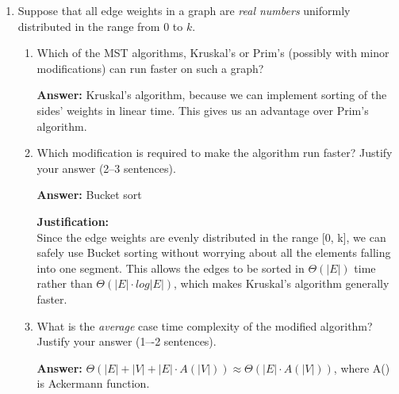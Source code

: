 \documentclass[dvipsnames]{article}
\begin{document}
\begin{enumerate}
\begin{enumerate}
    \item Justify the asymptotic time complexity (1--3 sentences).

    \color{blue}
    \textbf{Justification:}\\
    Adding a vertex takes $\Theta(1)$. Adding all sides will take $\Theta(|V|-1)$ in the worst case, if the new vertex is connected to each old one. The most expensive is the Kruskal's algorithm, which takes $\Theta(|V|\cdot \log(|V|))$, but since the maximum number of edges in the algorithm is the old $|V| -1$ and the new ones added in the worst case $|V| - 1$ give us $\Theta((2\cdot |V|-2)\cdot \log(|V|)) \approx \Theta(|V|\cdot \log(|V|))$. Therefore, $\Theta(1 + |V| - 1+|V|\cdot \log(|V|)) \approx \Theta(|V|\cdot \log(|V|))$
    \color{black}
  \end{enumerate}

  \clearpage
  \item Suppose that all edge weights in a graph are \emph{real numbers} uniformly distributed in the range from $0$ to $k$.

  \begin{enumerate}
    \item Which of the MST algorithms, Kruskal's or Prim's (possibly with minor modifications) can run faster on such a graph?

    \color{blue}
    \textbf{Answer:} Kruskal's algorithm, because we can implement sorting of the sides' weights in linear time. This gives us an advantage over Prim's algorithm.
    
    \color{black}

    \item Which modification is required to make the algorithm run faster? Justify your answer (2--3 sentences).

    \color{blue}
    \textbf{Answer:} Bucket sort

    \textbf{Justification:}\\
    Since the edge weights are evenly distributed in the range [0, k], we can safely use Bucket sorting without worrying about all the elements falling into one segment. This allows the edges to be sorted in $\Theta(|E|)$ time rather than $\Theta(|E|\cdot log |E|)$, which makes Kruskal's algorithm generally faster.
    \color{black}

    \item What is the \emph{average} case time complexity of the modified algorithm? Justify your answer (1–-2 sentences).

    \color{blue}
    \textbf{Answer:} $\Theta(|E| + |V| + |E|\cdot A(|V|)) \approx \Theta(|E|\cdot A(|V|))$, where A() is Ackermann function.


\end{enumerate}
\end{enumerate}
\end{document}
